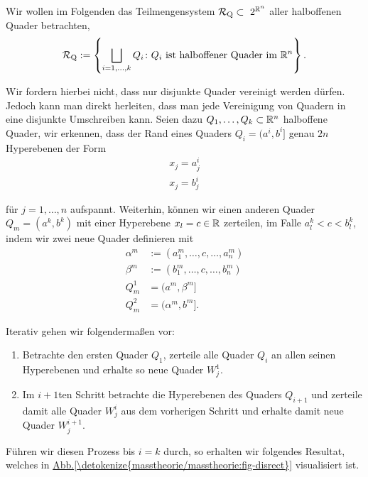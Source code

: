 \par
Wir wollen im Folgenden das Teilmengensystem \(\mathcal{R}_{\text{Q}}\subset\ 2^{\mathbb{R}^n}\) aller halboffenen Quader betrachten,
\begin{align*}
\mathcal{R}_{\text{Q}} := \left\{ \bigsqcup_{i=1,\ldots,k} Q_i \colon Q_i \text{ ist halboffener Quader im } \mathbb{R}^n \right\}.
\end{align*}
\par
Wir fordern hierbei nicht, dass nur disjunkte Quader vereinigt werden dürfen. Jedoch kann man direkt herleiten, dass man jede Vereinigung von Quadern in eine disjunkte Umschreiben kann. Seien dazu \(Q_1,\ldots,Q_k\subset\mathbb{R}^n\) halboffene Quader, wir erkennen, dass der Rand eines Quaders \(Q_i=(a^i,b^i]\) genau \(2n\) Hyperebenen der Form
\begin{align*}
x_j = a^i_j\\
x_j = b^i_j
\end{align*}
\par
für \(j=1,\ldots,n\) aufspannt. Weiterhin, können wir einen anderen Quader \(Q_m=(a^k,b^k)\) mit einer Hyperebene \(x_l=c\in\mathbb{R}\) zerteilen, im Falle \(a^k_l < c < b^k_l\), indem wir zwei neue Quader definieren mit
\begin{align*}
\alpha^m&:=(a^m_1,\ldots,c,\ldots,a^m_n)\\
\beta^m&:=(b^m_1,\ldots,c,\ldots,b^m_n)\\
Q_m^1&=(a^m,\beta^m]\\
Q_m^2&=(\alpha^m,b^m].
\end{align*}
\par
Iterativ gehen wir folgendermaßen vor:
\begin{enumerate}

\item {} 
\par
Betrachte den ersten Quader \(Q_1\), zerteile alle Quader \(Q_i\) an allen seinen Hyperebenen und erhalte so neue Quader \(W^1_j\).

\item {} 
\par
Im \(i+1\)ten Schritt betrachte die Hyperebenen des Quaders \(Q_{i+1}\) und zerteile damit alle Quader \(W^i_j\) aus dem vorherigen Schritt und erhalte damit neue Quader \(W^{i+1}_j\).

\end{enumerate}

\par
Führen wir diesen Prozess bis \(i=k\) durch, so erhalten wir folgendes Resultat, welches in \hyperref[\detokenize{masstheorie/masstheorie:fig-disrect}]{Abb.\@ \ref{\detokenize{masstheorie/masstheorie:fig-disrect}}} visualisiert ist.


